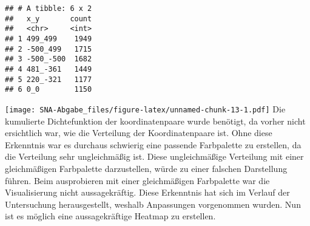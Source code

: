\documentclass[
]{article}
\newenvironment{Shaded}{\begin{snugshade}}{\end{snugshade}}
\newcommand{\AttributeTok}[1]{\textcolor[rgb]{0.13,0.29,0.53}{#1}}
\newcommand{\CommentTok}[1]{\textcolor[rgb]{0.56,0.35,0.01}{\textit{#1}}}
\newcommand{\DecValTok}[1]{\textcolor[rgb]{0.00,0.00,0.81}{#1}}
\newcommand{\FunctionTok}[1]{\textcolor[rgb]{0.13,0.29,0.53}{\textbf{#1}}}
\newcommand{\NormalTok}[1]{#1}
\newcommand{\OtherTok}[1]{\textcolor[rgb]{0.56,0.35,0.01}{#1}}
\newcommand{\SpecialCharTok}[1]{\textcolor[rgb]{0.81,0.36,0.00}{\textbf{#1}}}
\newcommand{\StringTok}[1]{\textcolor[rgb]{0.31,0.60,0.02}{#1}}
\begin{document}
\begin{verbatim}
## # A tibble: 6 x 2
##   x_y       count
##   <chr>     <int>
## 1 499_499    1949
## 2 -500_499   1715
## 3 -500_-500  1682
## 4 481_-361   1449
## 5 220_-321   1177
## 6 0_0        1150
\end{verbatim}

\begin{Shaded}
\end{Shaded}

\texttt{[image: SNA-Abgabe\_files/figure-latex/unnamed-chunk-13-1.pdf]}
Die kumulierte Dichtefunktion der koordinatenpaare wurde benötigt, da
vorher nicht ersichtlich war, wie die Verteilung der Koordinatenpaare
ist. Ohne diese Erkenntnis war es durchaus schwierig eine passende
Farbpalette zu erstellen, da die Verteilung sehr ungleichmäßig ist.
Diese ungleichmäßige Verteilung mit einer gleichmäßigen Farbpalette
darzustellen, würde zu einer falschen Darstellung führen. Beim
ausprobieren mit einer gleichmäßigen Farbpalette war die Visualisierung
nicht aussagekräftig. Diese Erkenntnis hat sich im Verlauf der
Untersuchung herausgestellt, weshalb Anpassungen vorgenommen wurden. Nun
ist es möglich eine aussagekräftige Heatmap zu erstellen.
\end{document}
